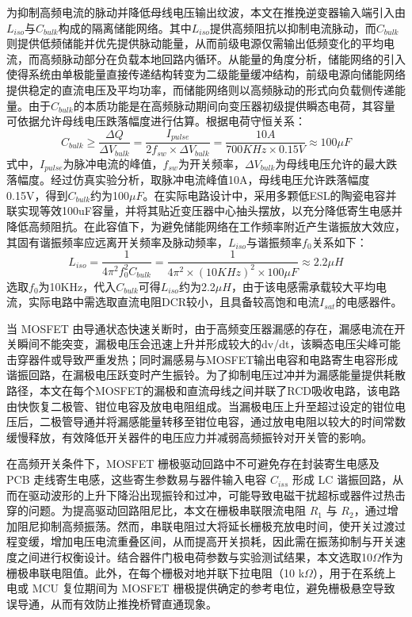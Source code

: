 为抑制高频电流的脉动并降低母线电压输出纹波，本文在推挽逆变器输入端引入由$L_{iso}$与$C_{bulk}$构成的隔离储能网络。其中$L_{iso}$提供高频阻抗以抑制电流脉动，而$C_{bulk}$则提供低频储能并优先提供脉动能量，从而前级电源仅需输出低频变化的平均电流，而高频脉动部分在负载本地回路内循环。从能量的角度分析，储能网络的引入使得系统由单极能量直接传递结构转变为二级能量缓冲结构，前级电源向储能网络提供稳定的直流电压及平均功率，而储能网络则以高频脉动的形式向负载侧传递能量。由于$C_{bulk}$的本质功能是在高频脉动期间向变压器初级提供瞬态电荷，其容量可依据允许母线电压跌落幅度进行估算。根据电荷守恒关系：
\begin{equation}
	C_{bulk} \geq \frac{\Delta Q}{\Delta V_{bulk}} = \frac{I_{pulse}}{2f_{sw}\times\Delta V_{bulk}} = \frac{10A}{700KHz\times 0.15V} \approx 100\mu F
\end{equation}
式中，$I_{pulse}$为脉冲电流的峰值，$f_{sw}$为开关频率，$\Delta V_{bulk}$为母线电压允许的最大跌落幅度。经过仿真实验分析，取脉冲电流峰值10A，母线电压允许跌落幅度0.15V，得到$C_{bulk}$约为100$\mu F$。在实际电路设计中，采用多颗低ESL的陶瓷电容并联实现等效100uF容量，并将其贴近变压器中心抽头摆放，以充分降低寄生电感并降低高频阻抗。在此容值下，为避免储能网络在工作频率附近产生谐振放大效应，其固有谐振频率应远离开关频率及脉动频率，$L_{iso}$与谐振频率$f_{0}$关系如下：
\begin{equation}
	L_{iso} = \frac{1}{4\pi^2f_{0}^2C_{bulk}} = \frac{1}{4\pi^2\times(10KHz)^2\times 100\mu F} \approx 2.2\mu H
\end{equation}
选取$f_{0}$为10KHz，代入$C_{bulk}$可得$L_{iso}$约为2.2$\mu H$，由于该电感需承载较大平均电流，实际电路中需选取直流电阻DCR较小，且具备较高饱和电流$I_{sat}$的电感器件。

当 MOSFET 由导通状态快速关断时，由于高频变压器漏感的存在，漏感电流在开关瞬间不能突变，漏极电压会迅速上升并形成较大的dv/dt，该瞬态电压尖峰可能击穿器件或导致严重发热；同时漏感易与MOSFET输出电容和电路寄生电容形成谐振回路，在漏极电压跃变时产生振铃。为了抑制电压过冲并为漏感能量提供耗散路径，本文在每个MOSFET的漏极和直流母线之间并联了RCD吸收电路，该电路由快恢复二极管、钳位电容及放电电阻组成。当漏极电压上升至超过设定的钳位电压后，二极管导通并将漏感能量转移至钳位电容，通过放电电阻以较大的时间常数缓慢释放，有效降低开关器件的电压应力并减弱高频振铃对开关管的影响。

在高频开关条件下，MOSFET 栅极驱动回路中不可避免存在封装寄生电感及 PCB 走线寄生电感，这些寄生参数易与器件输入电容 $C_{iss}$ 形成 LC 谐振回路，从而在驱动波形的上升下降沿出现振铃和过冲，可能导致电磁干扰超标或器件过热击穿的问题。为提高驱动回路阻尼比，本文在栅极串联限流电阻 $R_1$ 与 $R_2$，通过增加阻尼抑制高频振荡。然而，串联电阻过大将延长栅极充放电时间，使开关过渡过程变缓，增加电压电流重叠区间，从而提高开关损耗，因此需在振荡抑制与开关速度之间进行权衡设计。结合器件门极电荷参数与实验测试结果，本文选取10$\Omega$作为栅极串联电阻值。此外，在每个栅极对地并联下拉电阻（10 k$\Omega$），用于在系统上电或 MCU 复位期间为 MOSFET 栅极提供确定的参考电位，避免栅极悬空导致误导通，从而有效防止推挽桥臂直通现象。

